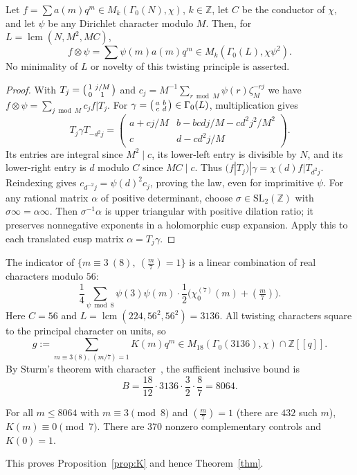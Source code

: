 \documentclass[11pt]{article}
\theoremstyle{remark}\newtheorem{remark}[theorem]{Remark}
\begin{document}
\begin{lemma}\label{lem:tw} Let $f=\sum a(m)q^m\in M_k(\Gamma_0(N),\chi)$, $k\in\mathbb Z$, let $C$ be the conductor of $\chi$, and let $\psi$ be any Dirichlet character modulo $M$. Then, for $L=\operatorname{lcm}(N,M^2,MC)$,
\[f\otimes\psi=\sum\psi(m)a(m)q^m\in M_k(\Gamma_0(L),\chi\psi^2).\]
No minimality of $L$ or novelty of this twisting principle is asserted.\end{lemma}
\begin{proof} With $T_j=\begin{psmallmatrix}1&j/M\\0&1\end{psmallmatrix}$ and $c_j=M^{-1}\sum_{r\bmod M}\psi(r)\zeta_M^{-rj}$ we have $f\otimes\psi=\sum_{j\bmod M}c_j f|T_j$. For $\gamma=\begin{psmallmatrix}a&b\\c&d\end{psmallmatrix}\in\Gamma_0(L)$, multiplication gives
\[T_j\gamma T_{-d^2j}=\begin{pmatrix}a+cj/M&b-bcdj/M-cd^2j^2/M^2\\c&d-cd^2j/M\end{pmatrix}.\]
Its entries are integral since $M^2\mid c$, its lower-left entry is divisible by $N$, and its lower-right entry is $d$ modulo $C$ since $MC\mid c$. Thus $(f|T_j)|\gamma=\chi(d)f|T_{d^2j}$. Reindexing gives $c_{d^{-2}j}=\psi(d)^2c_j$, proving the law, even for imprimitive $\psi$. For any rational matrix $\alpha$ of positive determinant, choose $\sigma\in\mathrm{SL}_2(\mathbb Z)$ with $\sigma\infty=\alpha\infty$. Then $\sigma^{-1}\alpha$ is upper triangular with positive dilation ratio; it preserves nonnegative exponents in a holomorphic cusp expansion. Apply this to each translated cusp matrix $\alpha=T_j\gamma$.\end{proof}

The indicator of $\{m\equiv3\ (8),\ (\frac m7)=1\}$ is a linear combination of real characters modulo $56$:
\[\frac14\sum_{\psi\bmod8}\psi(3)\psi(m)\cdot\frac12\big(\chi_0^{(7)}(m)+(\tfrac m7)\big).\]
Here $C=56$ and $L=\operatorname{lcm}(224,56^2,56^2)=3136$. All twisting characters square to the principal character on units, so
\[g:=\sum_{m\equiv3(8),\,(m/7)=1}K(m)q^m\in M_{18}(\Gamma_0(3136),\chi)\cap\mathbb Z[[q]].\]
By Sturm's theorem with character~\cite{Sturm,Ono}, the sufficient inclusive bound is
\[B=\frac{18}{12}\cdot3136\cdot\frac32\cdot\frac87=8064.\]

\begin{proposition}[computation]\label{prop:comp} For all $m\le8064$ with $m\equiv3\pmod8$ and $\left(\frac m7\right)=1$ (there are $432$ such $m$), $K(m)\equiv0\pmod7$. There are $370$ nonzero complementary controls and $K(0)=1$.\end{proposition}
This proves Proposition~\ref{prop:K} and hence Theorem~\ref{thm}.
\end{document}
